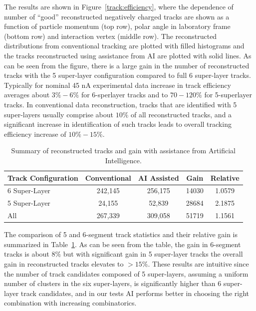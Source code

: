 The results are shown in Figure~\ref{track:efficiency}, where the dependence of number 
of ``good'' reconstructed negatively charged tracks are shown as a function of particle 
momentum (top row), polar angle in laboratory frame (bottom row) and interaction vertex 
(middle row). The reconstructed distributions from conventional tracking are plotted with 
filled histograms and the tracks reconstructed using assistance from AI are plotted with 
solid lines. As can be seen from the figure, there is a large gain in the number of reconstructed 
tracks with the 5 super-layer configuration compared to full 6 super-layer tracks. Typically 
for nominal 45 nA experimental data increase in track efficiency averages about $3\%-6\%$ 
for 6-sperlayer tracks and to $70-120\%$ for 5-superlayer tracks. In conventional data 
reconstruction, tracks that are identified with 5 super-layers usually comprise about $10\%$ 
of all reconstructed tracks, and a significant increase in identification of such tracks leads to 
overall tracking efficiency increase of $10\%-15\%$. 
 
 \begin{table}[!h]
 \begin{center}
 \begin{tabular}{|l|c|c|c|c|}
 \hline
 Track Configuration & Conventional & AI Assisted & Gain & Relative \\
 \hline
 \hline
 6 Super-Layer & 242,145 & 256,175 & 14030 & 1.0579 \\
 5 Super-Layer & 24,155 & 52,839 & 28684 & 2.1875 \\
 All & 267,339 & 309,058 & 51719 & 1.1561 \\
 \hline
 \end{tabular}
 \end{center}
 \caption{Summary of reconstructed tracks and gain with assistance from Artificial Intelligence.}
 \label{tbl:summary}
 \end{table}
 
The comparison of 5 and 6-segment track statistics and their relative gain is 
summarized in Table~\ref{tbl:summary}. As can be seen from the table, the 
gain in 6-segment tracks is about $8\%$ but with significant gain in 5 super-layer tracks 
the overall gain in reconstructed tracks elevates to $>15\%$. These results are intuitive 
since the number of track candidates composed of 5 super-layers, assuming a uniform 
number of clusters in the six super-layers, is significantly higher than 6 super-layer track 
candidates, and in our tests AI performs better in choosing the right combination with 
increasing combinatorics.
 
